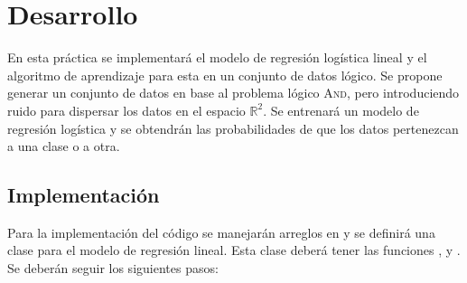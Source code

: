 \section{Desarrollo}

En esta práctica se implementará el modelo de regresión logística lineal y el algoritmo de aprendizaje para esta en un conjunto de datos lógico. Se propone generar un conjunto de datos en base al problema lógico \textsc{And}, pero introduciendo ruido para dispersar los datos en el espacio $\mathbb{R}^2$. Se entrenará un modelo de regresión logística y se obtendrán las probabilidades de que los datos pertenezcan a una clase o a otra.



\subsection{Implementación}

Para la implementación del código se manejarán arreglos en  y se definirá una clase para el modelo de regresión lineal. Esta clase deberá tener las funciones ,  y . Se deberán seguir los siguientes pasos:



